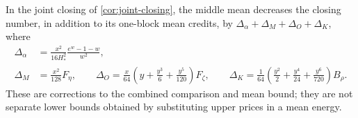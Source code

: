 \begin{proposition}\label{prop:joint-middle-mean}
In the joint closing of \cref{cor:joint-closing}, the middle mean
decreases the closing number, in addition to its one-block mean
credits, by $\Delta_\alpha+\Delta_M+\Delta_O+\Delta_K$, where
\begin{align}
 \Delta_\alpha&=\frac{x^2}{16H_*^2}
                 \frac{e^w-1-w}{w^2},\label{eq:joint-alpha}\\
 \Delta_M&=\frac{x^2}{128}F_\eta,\qquad
 \Delta_O=\frac{x}{64}\left(y+\frac{y^3}{6}+\frac{y^5}{120}\right)F_\zeta,
 \qquad
 \Delta_K=\frac1{64}\left(\frac{y^2}{2}+\frac{y^4}{24}+\frac{y^6}{720}\right)B_\rho.
 \label{eq:joint-middle}
\end{align}
These are corrections to the combined comparison and mean bound;
they are not separate lower bounds obtained by substituting upper
prices in a mean energy.
\end{proposition}

